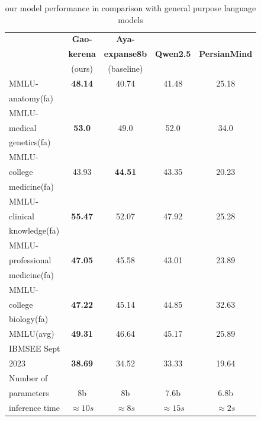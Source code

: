 \documentclass[conference]{IEEEtran}
\begin{document}
	\begin{table}[ht]
		\centering
		\caption{
			our model performance 
			in comparison with general purpose language models
		}
		\begin{tabular}{|l|c|c|c|c|}  %
			\hline
			\textbf{} & \textbf{Gao-} & \textbf{Aya-} &  &  \\ 
			& \textbf{kerena} & \textbf{expanse8b} & \textbf{Qwen2.5} & \textbf{PersianMind} \\
			& (ours) & (baseline) &  &  \\ \hline
			MMLU- & \textbf{48.14} & 40.74 & 41.48 & 25.18 \\ 
			anatomy(fa) &  &  &  &  \\ \hline
			MMLU- &  &  &  &  \\
			medical & \textbf{53.0} & 49.0 & 52.0 & 34.0 \\ 
			genetics(fa) &  &  &  &  \\ \hline
			MMLU- &  &  &  &  \\
			college & 43.93 & \textbf{44.51} & 43.35 & 20.23 \\
			medicine(fa) &  &  &  &  \\ \hline
			MMLU- &  &  &  &  \\
			clinical& \textbf{55.47} & 52.07 & 47.92 & 25.28 \\
			knowledge(fa)&  &  &  &  \\ \hline
			MMLU- &  &  &  &  \\
			professional& \textbf{47.05} & 45.58 & 43.01 & 23.89 \\ 
			medicine(fa)&  &  &  &  \\ \hline
			MMLU- &  &  &  &  \\
			college& \textbf{47.22} & 45.14 & 44.85 & 32.63 \\
			biology(fa)&  &  &  &  \\ \hline
			MMLU(avg) & \textbf{49.31} & 46.64 & 45.17 & 25.89 \\ \hline
			IBMSEE Sept &  &  &  &  \\ 
			2023 & \textbf{38.69} & 34.52 & 33.33 & 19.64 \\  \hline
			Number of&  &  &  &  \\
			parameters & 8b & 8b & 7.6b & 6.8b \\ \hline
			inference time & $\approx 10s$ & $\approx 8s$ & $\approx 15s$ & $\approx 2s$ \\  \hline
		\end{tabular}
		\label{tab:model_results_on_mcqa_vs_general_purpose_languages}
	\end{table}
	
\end{document}
